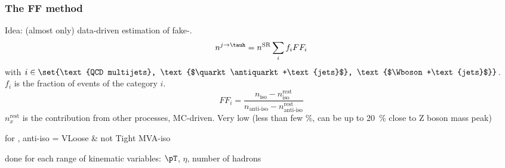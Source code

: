 \begin{frame}
\frametitle{The FF method}
\manip Idea: (almost only) data-driven estimation of fake-\tauh.
\begin{equation*}
n^{j\to\tauh} = n^\text{SR}\sum_i f_i FF_i
\end{equation*}
with $i\in\set{\text{QCD multijets}, \text{$\quarkt\antiquarkt+\text{jets}$}, \text{$\Wboson+\text{jets}$}}$.\\
$f_i$ is the fraction of events of the category $i$.
\begin{equation*}
FF_i = \frac{n_\text{iso} - n_\text{iso}^\text{rest}}{n_\text{anti-iso} - n_\text{anti-iso}^\text{rest}}
\end{equation*}
$n_x^\text{rest}$ is the contribution from other processes, MC-driven. Very low (less than few \%, can be up to \SI{20}{\%} close to Z boson mass peak)

for \tauh, anti-iso = VLoose \& not Tight MVA-iso

done for each range of kinematic variables: $\pT$, $\eta$, number of hadrons

\end{frame}




